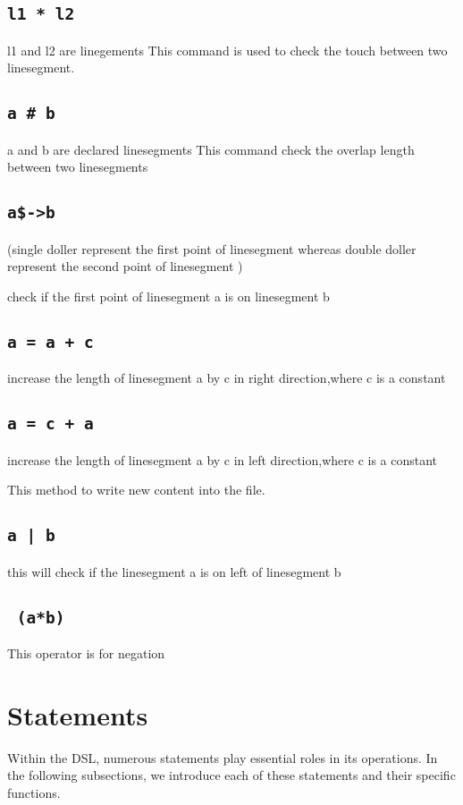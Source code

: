 \documentclass{article}
\begin{document}
\subsection{\texttt{l1 * l2}}
l1 and l2 are linegements
This command is used to check the touch between two linesegment.
\subsection{\texttt{a \# b}}
a and b are declared linesegments
This command check the overlap length between two linesegments

\subsection{\texttt{a\$->b}}
(single doller represent the first point of linesegment whereas double doller represent the second point of linesegment )

check if the first point of linesegment a is on linesegment b
\subsection{\texttt{a = a + c }}
increase the length of linesegment a by c in right direction,where c is a constant


\subsection{\texttt{a = c + a}}
increase the length of linesegment a by c in left direction,where c is a constant

This method to write new content into the file.
\subsection{\texttt{a | b}}

this  will check if the linesegment a is on left of linesegment b
\subsection{\texttt{\string~(a*b)}}


This operator is for negation

\section{Statements}
Within the DSL, numerous statements play essential roles in its operations. In the following subsections, we introduce each of these statements and their specific functions.
\end{document}
